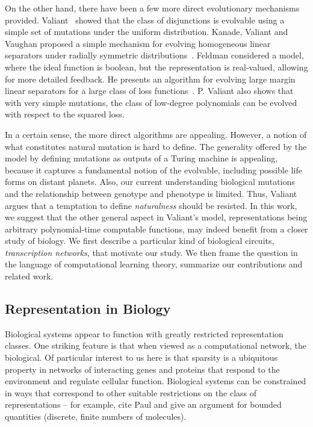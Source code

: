 On the other hand, there have been a few more direct evolutionary mechanisms
provided. Valiant~\cite{Valiant:2009-evolvability} showed that the class of
disjunctions is evolvable using a simple set of mutations under the uniform
distribution. Kanade, Valiant and Vaughan proposed a simple mechanism for
evolving homogeneous linear separators under radially symmetric
distributions~\cite{KVV:2010-drift}.  Feldman considered a model, where the
ideal function is boolean, but the representation is real-valued, allowing for
more detailed feedback. He presents an algorithm for evolving large margin
linear separators for a large class of loss functions~\cite{Feldman:2011-LTF}.
P.  Valiant also shows that with very simple mutations, the class of low-degree
polynomials can be evolved with respect to the squared loss.

In a certain sense, the more direct algorithms are appealing. However, a notion
of what constitutes natural mutation is hard to define. The generality offered
by the model by defining mutations as outputs of a Turing machine is appealing,
because it captures a fundamental notion of the evolvable, including possible
life forms on distant planets. Also, our current understanding biological
mutations and the relationship between genotype and phenotype is limited. Thus,
Valiant~\cite{Valiant:2013-PAC} argues that a temptation to define
\emph{naturalness} should be resisted. In this work, we suggest that the other
general aspect in Valiant's model, representations being arbitrary
polynomial-time computable functions, may indeed benefit from a closer study of
biology. We first describe a particular kind of biological circuits,
\emph{transcription networks}, that motivate our study. We then frame the
question in the language of computational learning theory, summarize our
contributions and related work.

\subsection{Representation in Biology}

Biological systems appear to function with greatly restricted representation
classes. One striking feature is that when viewed as a computational network,
the biological.  Of particular interest to us here is that
sparsity is a ubiquitous property in networks of interacting genes and proteins
that respond to the environment and regulate cellular function.  Biological
systems can be constrained in ways that correspond to other suitable
restrictions on the class of representations -- for example, cite Paul and give
an argument for bounded quantities (discrete, finite numbers of molecules).

